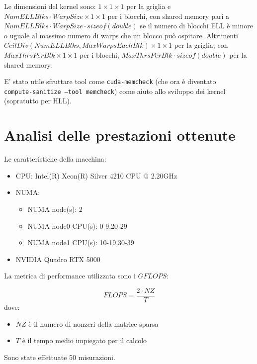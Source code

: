\documentclass[a4paper,9pt]{extarticle}
\begin{document}
Le dimensioni del kernel sono: $1 \times 1 \times 1$ per la griglia e $NumELLBlks \cdot WarpSize \times 1 \times 1$ per i blocchi, con
shared memory pari a $NumELLBlks \cdot WarpSize \cdot sizeof(double)$ se il numero di blocchi ELL è minore o uguale
al massimo numero di warps che un blocco può ospitare. Altrimenti \\ 
$CeilDiv(NumELLBlks, MaxWarpsEachBlk) \times 1 \times 1$ 
per la griglia, con \\ $MaxThrsPerBlk \times 1 \times 1$  per i blocchi, $MaxThrsPerBlk \cdot sizeof(double)$ per la shared
memory.

E' stato utile sfruttare tool come \texttt{cuda-memcheck} (che ora è diventato \\ \texttt{compute-sanitize --tool memcheck})
come aiuto allo sviluppo dei kernel (sopratutto per HLL).

\section{Analisi delle prestazioni ottenute}

Le caratteristiche della macchina:

\begin{itemize}
	\item CPU: Intel(R) Xeon(R) Silver 4210 CPU @ 2.20GHz
	\item NUMA:
		\begin{itemize}
  		\item NUMA node(s):          2
  		\item NUMA node0 CPU(s):     0-9,20-29
  		\item NUMA node1 CPU(s):     10-19,30-39
  		\end{itemize}
  	\item NVIDIA Quadro RTX 5000
\end{itemize}

La metrica di performance utilizzata sono i $GFLOPS$:

\begin{equation*}
FLOPS = \frac{2 \cdot NZ}{T}
\end{equation*}
dove:
\begin{itemize}
	\item $NZ$ è il numero di nonzeri della matrice sparsa
	\item $T$ è il tempo medio impiegato per il calcolo
\end{itemize}

Sono state effettuate 50 misurazioni.
\end{document}

